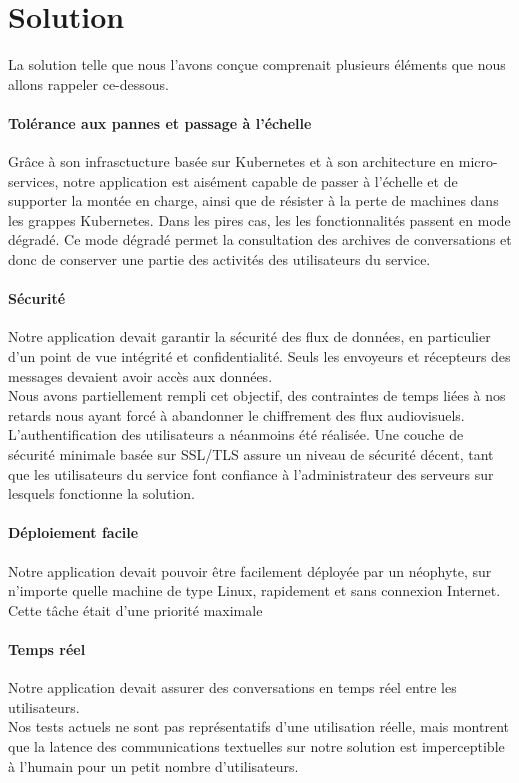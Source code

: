 \section{Solution}

La solution telle que nous l'avons conçue comprenait plusieurs
éléments que nous allons rappeler ce-dessous.

\paragraph{Tolérance aux pannes et passage à l'échelle} Grâce
à son infrasctucture basée sur Kubernetes et à son
architecture en micro-services, notre application est
aisément capable de passer à l'échelle et de supporter la
montée en charge, ainsi que de résister à la perte de
machines dans les grappes Kubernetes. Dans les pires cas, les
les fonctionnalités passent en mode dégradé. Ce mode dégradé
permet la consultation des archives de conversations et donc
de conserver une partie des activités des utilisateurs du
service.

\paragraph{Sécurité} Notre application devait garantir la
sécurité des flux de données, en particulier d'un point de
vue intégrité et confidentialité. Seuls les envoyeurs et
récepteurs des messages devaient avoir accès aux données.\\
Nous avons partiellement rempli cet objectif, des contraintes
de temps liées à nos retards nous ayant forcé à abandonner le
chiffrement des flux audiovisuels. L'authentification des
utilisateurs a néanmoins été réalisée. Une couche de sécurité
minimale basée sur SSL/TLS assure un niveau de sécurité
décent, tant que les utilisateurs du service font confiance
à l'administrateur des serveurs sur lesquels fonctionne la
solution.

\paragraph{Déploiement facile} Notre application devait
pouvoir être facilement déployée par un néophyte, sur
n'importe quelle machine de type Linux, rapidement et sans
connexion Internet. Cette tâche était d'une priorité maximale

\paragraph{Temps réel} Notre application devait assurer des
conversations en temps réel entre les utilisateurs.\\
Nos tests actuels ne sont pas représentatifs d'une utilisation
réelle, mais montrent que la latence des communications
textuelles sur notre solution est imperceptible à l'humain
pour un petit nombre d'utilisateurs.

